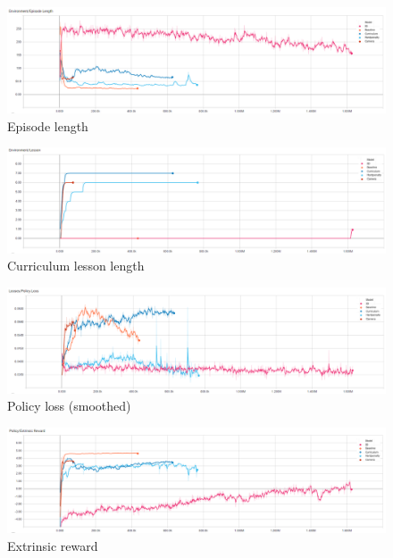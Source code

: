 \documentclass{ifacconf}
\begin{document}
\begin{figure}[!htb]
\begin{center}
\includegraphics[width=\linewidth]{res/episode_length.PNG} 
\caption{Episode length} 
\label{fig:eplen}
\end{center}
\end{figure}

\begin{figure}[!htb]
\begin{center}
\includegraphics[width=\linewidth]{res/lesson_length.PNG} 
\caption{Curriculum lesson length} 
\label{fig:leslen}
\end{center}
\end{figure}

\begin{figure}[!htb]
\begin{center}
\includegraphics[width=\linewidth]{res/policy_loss.PNG} 
\caption{Policy loss (smoothed)} 
\label{fig:polloss}
\end{center}
\end{figure}

\begin{figure}[!htb]
\begin{center}
\includegraphics[width=\linewidth]{res/extrinsic_reward.PNG} 
\caption{Extrinsic reward} 
\label{fig:exrew}
\end{center}
\end{figure}
\end{document}
